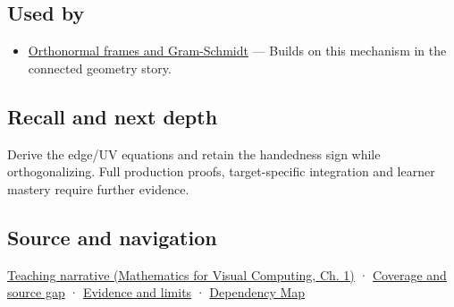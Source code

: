 \subsection{Used by}\label{appendix-e31893dec985-used-by}

\begin{itemize}
\tightlist
\item
  \hyperref[appendix-c39f1ed34271]{Orthonormal frames and Gram-Schmidt} --- Builds on this mechanism in the connected geometry story.
\end{itemize}

\subsection{Recall and next depth}\label{appendix-e31893dec985-recall-and-next-depth}

Derive the edge/UV equations and retain the handedness sign while orthogonalizing. Full production proofs, target-specific integration and learner mastery require further evidence.

\subsection{Source and navigation}\label{appendix-e31893dec985-source-and-navigation}

\href{../02-Mathematics-for-Visual-Computing/main.pdf\#nameddest=01-foundations-i-ch017-surface-movement-becomes-a-local-frame}{Teaching narrative (Mathematics for Visual Computing, Ch. 1)} · \hyperref[appendix-fd090d982a15-phase-6---parts-501-600]{Coverage and source gap} · \hyperref[appendix-a103e7846d21-phase-6---source-analysis-and-verification]{Evidence and limits} · \hyperref[appendix-4ad47bdd269a]{Dependency Map}
